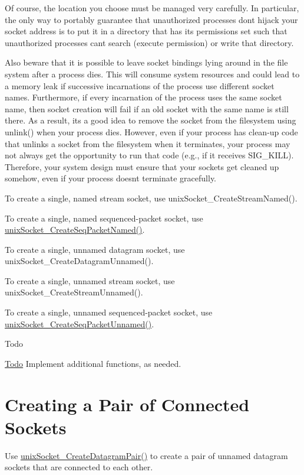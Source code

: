 Of course, the location you choose must be managed very carefully. In particular, the only way to portably guarantee that unauthorized processes don\textquotesingle{}t hijack your socket address is to put it in a directory that has its permissions set such that unauthorized processes can\textquotesingle{}t search (execute permission) or write that directory.

Also beware that it is possible to leave socket bindings lying around in the file system after a process dies. This will consume system resources and could lead to a memory leak if successive incarnations of the process use different socket names. Furthermore, if every incarnation of the process uses the same socket name, then socket creation will fail if an old socket with the same name is still there. As a result, its a good idea to remove the socket from the filesystem using unlink() when your process dies. However, even if your process has clean-\/up code that unlinks a socket from the filesystem when it terminates, your process may not always get the opportunity to run that code (e.\+g., if it receives S\+I\+G\+\_\+\+K\+I\+LL). Therefore, your system design must ensure that your sockets get cleaned up somehow, even if your process doesn\textquotesingle{}t terminate gracefully.

To create a single, named stream socket, use unix\+Socket\+\_\+\+Create\+Stream\+Named().

To create a single, named sequenced-\/packet socket, use \hyperlink{unix_socket_8h_a1a9716076a305c1e918584568da28907}{unix\+Socket\+\_\+\+Create\+Seq\+Packet\+Named()}.

To create a single, unnamed datagram socket, use unix\+Socket\+\_\+\+Create\+Datagram\+Unnamed().

To create a single, unnamed stream socket, use unix\+Socket\+\_\+\+Create\+Stream\+Unnamed().

To create a single, unnamed sequenced-\/packet socket, use \hyperlink{unix_socket_8h_abb4b00a74449a57fdfa4fd1a642fb37a}{unix\+Socket\+\_\+\+Create\+Seq\+Packet\+Unnamed()}.

\begin{DoxyRefDesc}{Todo}
\item[\hyperlink{todo__todo000055}{Todo}]Implement additional functions, as needed.\end{DoxyRefDesc}
\hypertarget{c_unixSockets_c_unixSocketsCreatingPair}{}\section{Creating a Pair of Connected Sockets}\label{c_unixSockets_c_unixSocketsCreatingPair}
Use \hyperlink{unix_socket_8h_a662207caa2695a24ff5abdbd82342a66}{unix\+Socket\+\_\+\+Create\+Datagram\+Pair()} to create a pair of unnamed datagram sockets that are connected to each other.


